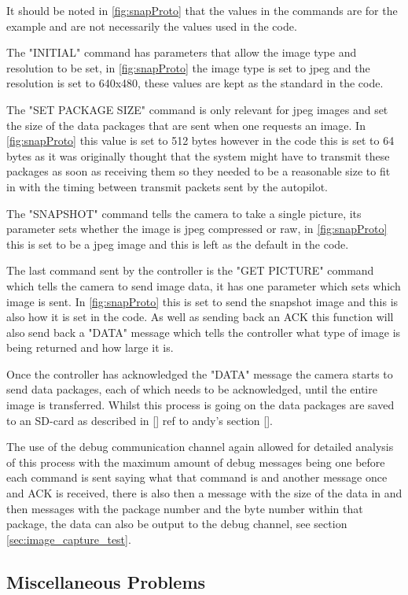 It should be noted in \ref{fig:snapProto} that the values in the commands are for the example and are not necessarily the values used in the code.

The "INITIAL" command has parameters that allow the image type and resolution to be set, in \ref{fig:snapProto} the image type is set to jpeg and the resolution is set to 640x480, these values are kept as the standard in the code.

The "SET PACKAGE SIZE" command is only relevant for jpeg images and set the size of the data packages that are sent when one requests an image. In \ref{fig:snapProto} this value is set to 512 bytes however in the code this is set to 64 bytes as it was originally thought that the system might have to transmit these packages as soon as receiving them so they needed to be a reasonable size to fit in with the timing between transmit packets sent by the autopilot.

The "SNAPSHOT" command tells the camera to take a single picture, its parameter sets whether the image is jpeg compressed or raw, in \ref{fig:snapProto} this is set to be a jpeg image and this is left as the default in the code.

The last command sent by the controller is the "GET PICTURE" command which tells the camera to send image data, it has one parameter which sets which image is sent. In \ref{fig:snapProto} this is set to send the snapshot image and this is also how it is set in the code. As well as sending back an ACK this function will also send back a "DATA" message which tells the controller what type of image is being returned and how large it is.

Once the controller has acknowledged the "DATA" message the camera starts to send data packages, each of which needs to be acknowledged, until the entire image is transferred. Whilst this process is going on the data packages are saved to an SD-card as described in [] ref to andy's section [].

The use of the debug communication channel again allowed for detailed analysis of this process with the maximum amount of debug messages being one before each command is sent saying what that command is and another message once and ACK is received, there is also then a message with the size of the data in and then messages with the package number and the byte number within that package, the data can also be output to the debug channel, see section \ref{sec:image_capture_test}.

\subsection{Miscellaneous Problems}

